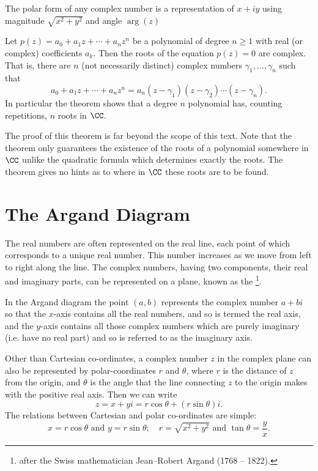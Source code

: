 \begin{definition}
The polar form of any complex number is a representation of $x+iy$ using magnitude $\sqrt{x^2+y^2}$ and angle $\arg(z)$
\end{definition}



\begin{theorem}
Let $p(z)=a_0+a_1z+\cdots+a_nz^n$ be a polynomial
of degree $n\ge1$ with real (or complex) coefficients $a_k$. Then the roots of the equation $p(z)=0$ are complex. That is, there are $n$ (not necessarily distinct) complex numbers $\gamma_1,\dots,\gamma_n$ such that
\[ a_0+a_1z+\cdots+a_nz^n=a_n(z-\gamma_1)(z-\gamma_2)\cdots(z-\gamma_n). \]
In particular the theorem shows that a degree $n$ polynomial has, counting repetitions, $n$ roots in $\CC$.
\end{theorem}

The proof of this theorem is far beyond the scope of this text. Note that the theorem only guarantees the existence of the roots of a polynomial somewhere in $\CC$ unlike the quadratic formula which determines exactly the roots. The theorem gives no hints as to where in $\CC$ these roots are to be found.

\section{The Argand Diagram}
The real numbers are often represented on the real line, each point of which corresponds to a unique real number. This number increases as we move from left to right along the line. The complex numbers, having two components, their real and imaginary parts, can be represented on a plane, known as the \footnote{after the Swiss mathematician Jean--Robert Argand (1768 -- 1822).}.

In the Argand diagram the point $(a,b)$ represents the complex number $a+bi$ so that the $x$-axis contains all the real numbers, and so is termed the real axis, and the $y$-axis contains all those complex numbers which are purely imaginary (i.e. have no real part) and so is referred to as the imaginary axis.

Other than Cartesian co-ordinates, a complex number $z$ in the complex plane can also be represented by polar-coordinates $r$ and $\theta$, where $r$ is the distance of $z$ from the origin, and $\theta$ is the angle that the line connecting $z$ to the origin makes with the positive real axis. Then we can write
\begin{equation}
z=x+yi=r\cos\theta+(r\sin\theta)i.
\end{equation}
The relations between Cartesian and polar co-ordinates are simple:
\[ x=r\cos\theta \text{ and } y=r\sin\theta; \quad r=\sqrt{x^2+y^2} \text{ and } \tan\theta=\frac{y}{x}. \]

